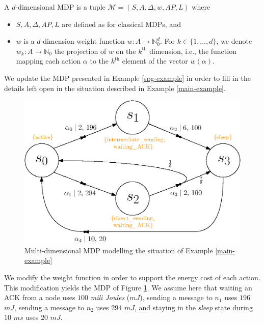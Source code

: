 \begin{definition}
  A $d$-dimensional MDP is a tuple $\mathcal{M}=(S, A, \Delta, w, AP, L)$ where
  \begin{itemize}
    \item $S, A, \Delta, AP, L$ are defined as for classical MDPs, and
    \item $w$ is a $d$-dimension weight function $w: A \rightarrow \mathbb{N}_0^d$.
    For $k \in \{1, \dots, d\}$, we denote $w_k:A\rightarrow\mathbb{N}_0$ the projection of $w$ on the $k^\text{th}$ dimension, i.e., the function mapping each action $\alpha$ to the $k^\text{th}$ element of the vector $w(\alpha)$.
  \end{itemize}
\end{definition}

\begin{example}
  We update the MDP presented in Example \ref{spg-example} in order to fill in the details left open in the situation described in Example \ref{main-example}.
  \begin{figure}[h]
    \centering
    \includegraphics[width=0.6\linewidth]{resources/mdmdp2}
    \captionsetup{justification=centering}
    \caption{Multi-dimensional MDP modelling the situation of Example \ref{main-example}}
    \label{multi-mdp}
  \end{figure}
  We modify the weight function in order to support the energy cost of each action. This modification yields the MDP of Figure \ref{multi-mdp}.
  We assume here that waiting an ACK from a node uses $100$ \textit{mili Joules} ($mJ$), sending a message to $n_1$ uses $196$ $mJ$, sending a message to $n_2$ uses $294$ $mJ$, and staying in the \textit{sleep} state during $10$ $ms$ uses $20$ $mJ$.
\end{example}

